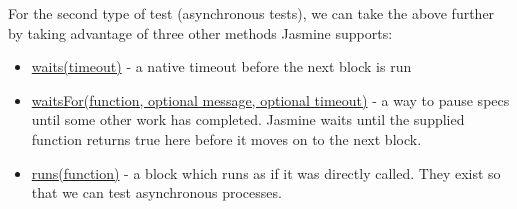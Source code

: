 \documentclass[9pt]{book}
\newenvironment{Shaded}{}{}
\newcommand{\KeywordTok}[1]{\textcolor[rgb]{0.00,0.44,0.13}{\textbf{{#1}}}}
\newcommand{\DataTypeTok}[1]{\textcolor[rgb]{0.56,0.13,0.00}{{#1}}}
\newcommand{\DecValTok}[1]{\textcolor[rgb]{0.25,0.63,0.44}{{#1}}}
\newcommand{\StringTok}[1]{\textcolor[rgb]{0.25,0.44,0.63}{{#1}}}
\newcommand{\CommentTok}[1]{\textcolor[rgb]{0.38,0.63,0.69}{\textit{{#1}}}}
\newcommand{\OtherTok}[1]{\textcolor[rgb]{0.00,0.44,0.13}{{#1}}}
\newcommand{\FunctionTok}[1]{\textcolor[rgb]{0.02,0.16,0.49}{{#1}}}
\newcommand{\NormalTok}[1]{{#1}}
\begin{document}
For the second type of test (asynchronous tests), we can take the above
further by taking advantage of three other methods Jasmine supports:

\begin{itemize}
\itemsep1pt\parskip0pt
\item
  \href{https://github.com/pivotal/jasmine/wiki/Asynchronous-specs}{waits(timeout)}
  - a native timeout before the next block is run
\item
  \href{https://github.com/pivotal/jasmine/wiki/Asynchronous-specs}{waitsFor(function,
  optional message, optional timeout)} - a way to pause specs until some
  other work has completed. Jasmine waits until the supplied function
  returns true here before it moves on to the next block.
\item
  \href{https://github.com/pivotal/jasmine/wiki/Asynchronous-specs}{runs(function)}
  - a block which runs as if it was directly called. They exist so that
  we can test asynchronous processes.
\end{itemize}

\begin{Shaded}
\end{Shaded}
\end{document}
